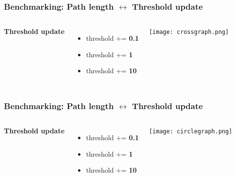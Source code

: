 \documentclass{beamer}
\begin{document}
\begin{frame}
\frametitle{Benchmarking: Path length $\leftrightarrow$ Threshold update}
\begin{columns}[c] %
\textbf{Threshold update}
\begin{itemize}
\item \textcolor{0.1}{threshold += \textbf{0.1}}
\item \textcolor{1}{threshold += \textbf{1}}
\item \textcolor{10}{threshold += \textbf{10}}
\end{itemize}

\begin{center}
	\texttt{[image: crossgraph.png]}
\end{center}
\end{columns}
\end{frame}


\begin{frame}
\frametitle{Benchmarking: Path length $\leftrightarrow$ Threshold update}
\begin{columns}[c] %
\textbf{Threshold update}
\begin{itemize}
\item \textcolor{0.1}{threshold += \textbf{0.1}}
\item \textcolor{1}{threshold += \textbf{1}}
\item \textcolor{10}{threshold += \textbf{10}}
\end{itemize}

\begin{center}
	\texttt{[image: circlegraph.png]}
\end{center}
\end{columns}
\end{frame}
\end{document}
